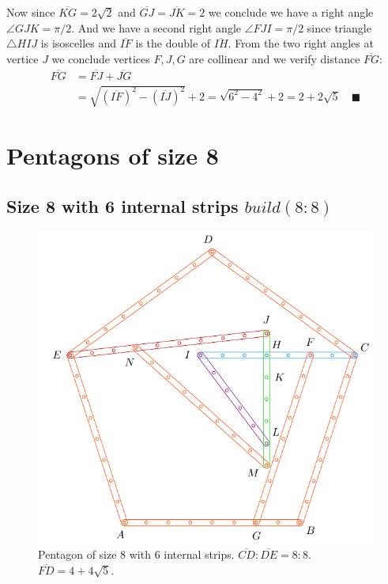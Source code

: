 \documentclass[11pt]{article}
\begin{document}
Now since $\overline{KG} = 2\sqrt2$ and $\overline{GJ} = \overline{JK} = 2$ we conclude we have a right angle $\angle{GJK} = \pi / 2.$ And we have a second right angle $\angle{FJI} = \pi/2$ since triangle $\triangle{HIJ}$ is isoscelles and $\overline{IF}$ is the double of $\overline{IH}$. From the two right angles at vertice $J$ we conclude vertices $F,J,G$ are collinear and we verify distance $\overline{FG}$:
\begin{align}
\overline{FG} &= \overline{FJ} + \overline{JG} \nonumber\\
 &= \sqrt{(\overline{IF})^2 - (\overline{IJ})^2} + 2
 = \sqrt{6^2 - 4^2} + 2 = 2 + 2\sqrt5 \quad \blacksquare
\end{align}


\section{Pentagons of size 8}

\subsection{Size 8 with 6 internal strips $build(8:8)$}

\begin{figure}[H]
\centering
\includegraphics[scale=1]{8/penta8-6a}
\caption{Pentagon of size 8 with 6 internal strips. $\overline{CD} : \overline{DE} = 8:8$. $\overline{FD} = 4 + 4\sqrt5$.}
\label{fig:penta8-6a}
\end{figure}
\end{document}

